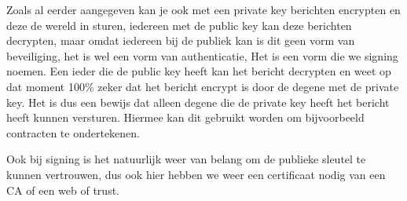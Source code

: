 Zoals al eerder aangegeven kan je ook met een private key berichten encrypten en deze de wereld in sturen, iedereen met de public key kan deze berichten decrypten, maar omdat iedereen bij de publiek kan is dit geen vorm van beveiliging, het is wel een vorm van authenticatie, Het is een vorm die we signing noemen. Een ieder die de public key heeft kan het bericht decrypten en weet op dat moment 100\% zeker dat het bericht encrypt is door de degene met de private key. Het is dus een bewijs dat alleen degene die de private key heeft het bericht heeft kunnen versturen. Hiermee kan dit gebruikt worden om bijvoorbeeld contracten te ondertekenen.

Ook bij signing is het natuurlijk weer van belang om de publieke sleutel te kunnen vertrouwen, dus ook hier hebben we weer een certificaat nodig van een CA of een web of trust.
